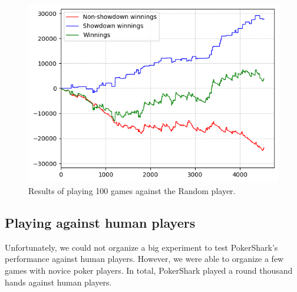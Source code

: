 \begin{figure}[H]
\begin{minipage}{\textwidth}
\begin{minipage}{0.5\textwidth}
            \includegraphics[width=\textwidth]{graphics/random.png}
        \end{minipage}
    \end{minipage}
    \caption{Results of playing 100 games against the Random player.}
    \label{fig:results_random}
\end{figure}

\subsection{Playing against human players}
Unfortunately, we could not organize a big experiment to test PokerShark's performance against human players. However, we were able to organize a few games with novice poker players. In total, PokerShark played a round thousand hands against human players.

